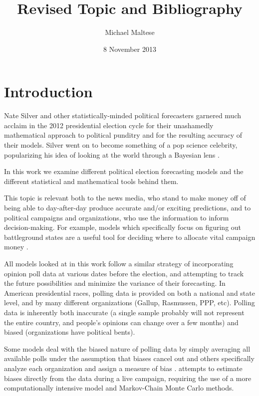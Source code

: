 \documentclass[12pt]{article}
\begin{document}
\title{\textbf{Revised Topic and Bibliography}}
\author{Michael Maltese}
\date{8 November 2013}
\maketitle

\section{Introduction}

Nate Silver and other statistically-minded political forecasters garnered much acclaim in the 2012 presidential election cycle for their unashamedly mathematical approach to political punditry and for the resulting accuracy of their models. Silver went on to become something of a pop science celebrity, popularizing his idea of looking at the world through a Bayesian lens \citep{Silver:2012aa}.

In this work we examine different political election forecasting models and the different statistical and mathematical tools behind them.

This topic is relevant both to the news media, who stand to make money off of being able to day-after-day produce accurate and/or exciting predictions, and to political campaigns and organizations, who use the information to inform decision-making. For example, models which specifically focus on figuring out battleground states are a useful tool for deciding where to allocate vital campaign money \citep{Strauss:2007aa}.

All models looked at in this work follow a similar strategy of incorporating opinion poll data at various dates before the election, and attempting to track the future possibilities and minimize the variance of their forecasting. In American presidential races, polling data is provided on both a national and state level, and by many different organizations (Gallup, Rasmussen, PPP, etc). Polling data is inherently both inaccurate (a single sample probably will not represent the entire country, and people's opinions can change over a few months) and biased (organizations have political bents).

Some models deal with the biased nature of polling data by simply averaging all available polls under the assumption that biases cancel out \citep{Wang:2012aa} and others specifically analyze each organization and assign a measure of bias \citep{Silver:2012aa}. \citet{Strauss:2007aa} attempts to estimate biases directly from the data during a live campaign, requiring the use of a more computationally intensive model and Markov-Chain Monte Carlo methods.
\end{document}

